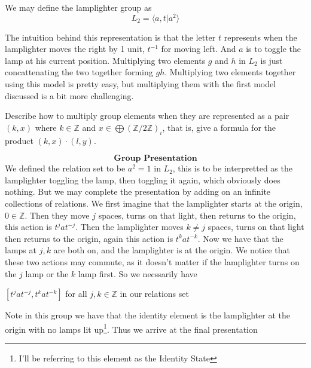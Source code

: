 \begin{definition}
    We may define the lamplighter group as
    \[L_2 = \langle a,t\vert a^2 \rangle\]
\end{definition}
The intuition behind this representation is that the letter $t$ represents when the lamplighter moves the right by 1 unit, $t^{-1}$ for moving left. And $a$ is to toggle the lamp at his current position. Multiplying two elements $g$ and $h$ in $L_2$ is just concattenating the two together forming $gh$. Multiplying two elements together using this model is pretty easy, but multiplying them with the first model discussed is a bit more challenging.
\begin{exercise}
    Describe how to multiply group elements when they are represented as a pair $(k,x)$ where $k\in\mathbb{Z}$ and $x\in\bigoplus(\mathbb{Z}/2\mathbb{Z})_i$, that is, give a formula for the product $(k, x)\cdot(l, y)$.
\end{exercise}
\[\textbf{Group Presentation}\]
We defined the relation set to be $a^2=1$ in $L_2$, this is to be interpretted as the lamplighter toggling the lamp, then toggling it again, which obviously does nothing. But we may complete the presentation by adding on an infinite collections of relations. We first imagine that the lamplighter starts at the origin, $0\in\mathbb{Z}$. Then they move $j$ spaces, turns on that light, then returns to the origin, this action is $t^jat^{-j}$. Then the lamplighter moves $k\neq j$ spaces, turns on that light then returns to the origin, again this action is $t^kat^{-k}$. Now we have that the lamps at $j,k$ are both on, and the lamplighter is at the origin. We notice that these two actions may commute, as it doesn't matter if the lamplighter turns on the $j$ lamp or the $k$ lamp first. So we necssarily have
\begin{center}
    $[t^jat^{-j},t^kat^{-k}]$ for all $j,k\in\mathbb{Z}$ in our relations set
\end{center}
Note in this group we have that the identity element is the lamplighter at the origin with no lamps lit up\footnote{I'll be referring to this element as the Identity State}. Thus we arrive at the final presentation

